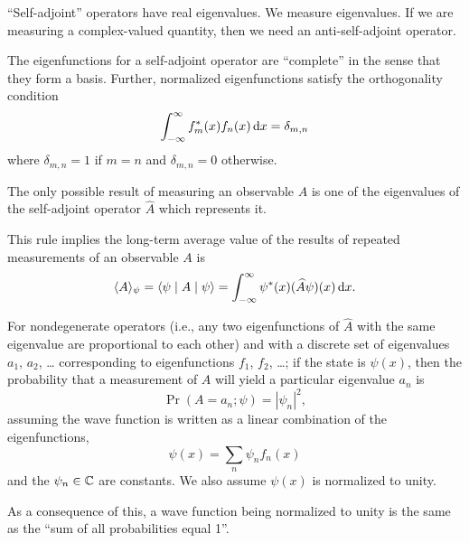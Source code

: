 \begin{remark}
``Self-adjoint'' operators have real eigenvalues. We measure
eigenvalues. If we are measuring a complex-valued quantity, then we
need an anti-self-adjoint operator.
\end{remark}

\begin{remark}
The eigenfunctions for a self-adjoint operator are ``complete'' in the
sense that they form a basis. Further, normalized eigenfunctions satisfy
the orthogonality condition
\begin{equation}
\int^{\infty}_{-\infty}f_{m}^{*}(x)f_{n}(x)\,\mathrm{d} x = \delta_{m,n}
\end{equation}
where $\delta_{m,n}=1$ if $m=n$ and $\delta_{m,n}=0$ otherwise.
\end{remark}

The only possible result of measuring an observable $A$ is one of the
eigenvalues of the self-adjoint operator $\widehat{A}$ which represents
it.

\begin{remark}
This rule implies the long-term average value of the results of repeated
measurements of an observable $A$ is
\begin{equation}
\langle A\rangle_{\psi} = \langle\psi\mid A\mid\psi\rangle = \int^{\infty}_{-\infty}\psi^{*}(x)(\widehat{A}\psi)(x)\,\mathrm{d} x.
\end{equation}
\end{remark}

\M
For nondegenerate operators (i.e., any two eigenfunctions of
$\widehat{A}$ with the same eigenvalue are proportional to each other)
and with a discrete set of eigenvalues $a_{1}$, $a_{2}$, \dots
corresponding to eigenfunctions $f_{1}$, $f_{2}$, \dots; if the state is
$\psi(x)$, then the probability that a measurement of $A$ will yield a
particular eigenvalue $a_{n}$ is
\begin{equation}
\Pr(A = a_{n}; \psi) = |\psi_{n}|^{2},
\end{equation}
assuming the wave function is written as a linear combination of the
eigenfunctions,
\begin{equation}
\psi(x) = \sum_{n}\psi_{n}f_{n}(x)
\end{equation}
and the $\psi_{n}\in\mathbb{C}$ are constants. We also assume $\psi(x)$ is
normalized to unity.

\begin{remark}
As a consequence of this, a wave function being normalized to unity is
the same as the ``sum of all probabilities equal 1''.
\end{remark}

